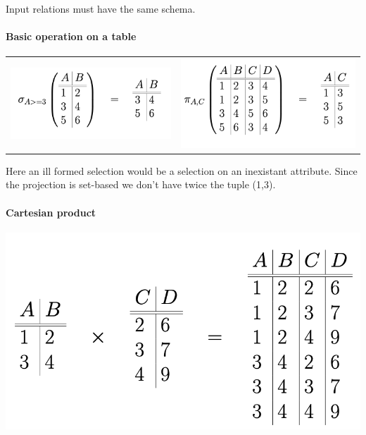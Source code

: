 \documentclass[12pt,a4paper]{article}
\begin{document}
Input relations must have the same schema.\\

\paragraph{Basic operation on a table}
\begin{center}
\begin{tabular}{c|c}
	\includegraphics[scale=0.45]{img/img6.png}&
	\includegraphics[scale=0.37]{img/img7.png}
\end{tabular}
\end{center}
Here an ill formed selection would be a selection on an inexistant attribute. Since the projection is set-based we don't have twice the tuple (1,3).

\paragraph{Cartesian product}
\begin{center}
	\includegraphics[scale=0.45]{img/img8.png}
\end{center}
\end{document}
